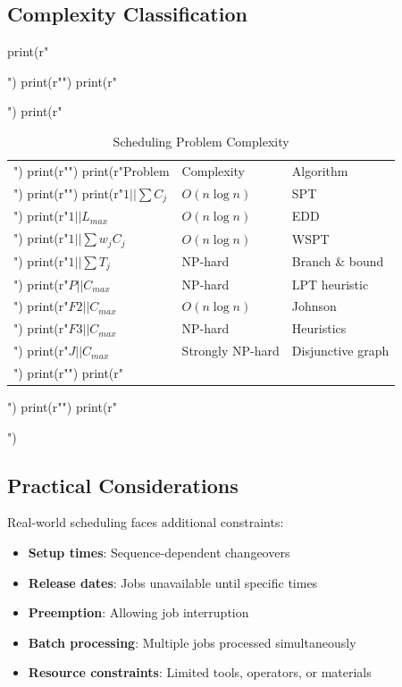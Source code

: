 \documentclass[a4paper, 11pt]{article}
\begin{document}
\subsection{Complexity Classification}

\begin{pycode}
print(r"\begin{table}[htbp]")
print(r"\centering")
print(r"\caption{Scheduling Problem Complexity}")
print(r"\begin{tabular}{lll}")
print(r"\toprule")
print(r"Problem & Complexity & Algorithm \\")
print(r"\midrule")
print(r"$1||\sum C_j$ & $O(n \log n)$ & SPT \\")
print(r"$1||L_{max}$ & $O(n \log n)$ & EDD \\")
print(r"$1||\sum w_j C_j$ & $O(n \log n)$ & WSPT \\")
print(r"$1||\sum T_j$ & NP-hard & Branch \& bound \\")
print(r"$P||C_{max}$ & NP-hard & LPT heuristic \\")
print(r"$F2||C_{max}$ & $O(n \log n)$ & Johnson \\")
print(r"$F3||C_{max}$ & NP-hard & Heuristics \\")
print(r"$J||C_{max}$ & Strongly NP-hard & Disjunctive graph \\")
print(r"\bottomrule")
print(r"\end{tabular}")
print(r"\label{tab:complexity}")
print(r"\end{table}")
\end{pycode}

\subsection{Practical Considerations}

Real-world scheduling faces additional constraints:
\begin{itemize}
\item \textbf{Setup times}: Sequence-dependent changeovers
\item \textbf{Release dates}: Jobs unavailable until specific times
\item \textbf{Preemption}: Allowing job interruption
\item \textbf{Batch processing}: Multiple jobs processed simultaneously
\item \textbf{Resource constraints}: Limited tools, operators, or materials
\end{itemize}
\end{document}
